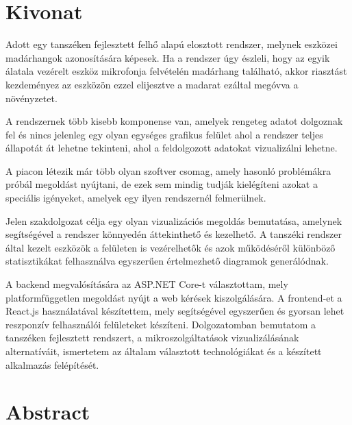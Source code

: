\setcounter{page}{1}

\selecthungarian

\chapter*{Kivonat}

Adott egy tanszéken fejlesztett felhő alapú elosztott rendszer, melynek eszközei madárhangok azonosítására képesek.
Ha a rendszer úgy észleli, hogy az egyik álatala vezérelt eszköz mikrofonja felvételén madárhang található,
akkor riasztást kezdeményez az eszközön ezzel elijesztve a madarat ezáltal megóvva a növényzetet.

A rendszernek több kisebb komponense van, amelyek rengeteg adatot dolgoznak fel és nincs jelenleg egy olyan egységes grafikus felület ahol a rendszer teljes állapotát
át lehetne tekinteni, ahol a feldolgozott adatokat vizualizálni lehetne.

A piacon létezik már több olyan szoftver csomag, amely hasonló problémákra próbál megoldást nyújtani, de ezek sem mindig
tudják kielégíteni azokat a speciális igényeket, amelyek egy ilyen rendszernél felmerülnek.

Jelen szakdolgozat célja egy olyan vizualizációs megoldás bemutatása, amelynek segítségével a rendszer könnyedén áttekinthető
és kezelhető. A tanszéki rendszer által kezelt eszközök a felületen is vezérelhetők 
és azok működéséről különböző statisztikákat felhasználva egyszerűen értelmezhető diagramok generálódnak.

A backend megvalósítására az ASP.NET Core-t választottam, mely platformfüggetlen megoldást nyújt a web kérések kiszolgálására.
A frontend-et a React.js használatával készítettem, mely segítségével egyszerűen és gyorsan lehet reszponzív felhasználói felületeket készíteni.
Dolgozatomban bemutatom a tanszéken fejlesztett rendszert, a mikroszolgáltatások vizualizálásának alternatíváit,
ismertetem az általam választott technológiákat és a készített alkalmazás felépítését.

\vfill
\selectenglish


\chapter*{Abstract}

